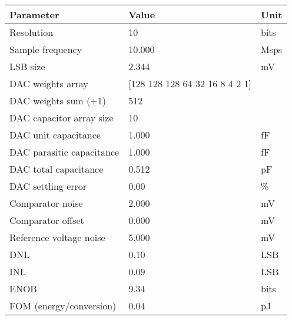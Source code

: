\begin{tabular}{lll}
\toprule
Parameter & Value & Unit \\
\midrule
Resolution & 10 & bits \\
Sample frequency & 10.000 & Msps \\
LSB size & 2.344 & mV \\
DAC weights array & [128 128 128  64  32  16   8   4   2   1] &  \\
DAC weights sum (+1) & 512 &  \\
DAC capacitor array size & 10 &  \\
DAC unit capacitance & 1.000 & fF \\
DAC parasitic capacitance & 1.000 & fF \\
DAC total capacitance & 0.512 & pF \\
DAC settling error & 0.00 & \% \\
Comparator noise & 2.000 & mV \\
Comparator offset & 0.000 & mV \\
Reference voltage noise & 5.000 & mV \\
DNL & 0.10 & LSB \\
INL & 0.09 & LSB \\
ENOB & 9.34 & bits \\
FOM (energy/conversion) & 0.04 & pJ \\
\bottomrule
\end{tabular}
